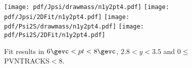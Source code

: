 \begin{figure}[H]
\begin{center}
\texttt{[image: pdf/Jpsi/drawmass/n1y2pt4.pdf]}
\texttt{[image: pdf/Jpsi/2DFit/n1y2pt4.pdf]}
\vspace*{-0.5cm}
\texttt{[image: pdf/Psi2S/drawmass/n1y2pt4.pdf]}
\texttt{[image: pdf/Psi2S/2DFit/n1y2pt4.pdf]}
\vspace*{-0.5cm}
\end{center}
\caption{Fit results in $6\gevc<pt<8\gevc$, $2.8<y<3.5$ and 0$\leq$PVNTRACKS$<$8.}
\label{Fitn1y2pt4}
\end{figure}
